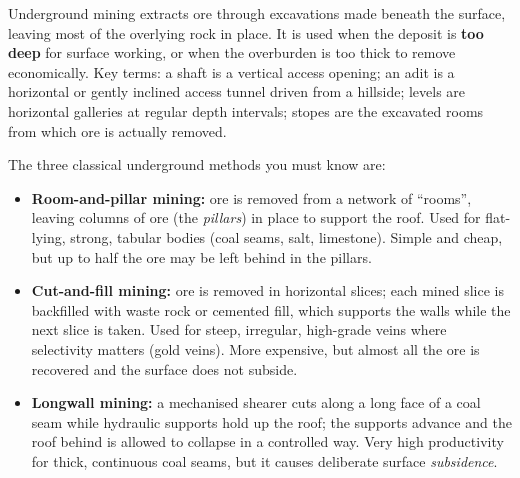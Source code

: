 \documentclass[11pt]{article}
\newcommand{\cle}[1]{{\popxbold\color{popdark}#1}}
\begin{document}
\begin{definition}
\cle{Underground mining} extracts ore through excavations made beneath the surface, leaving most of the overlying rock in place. It is used when the deposit is \textbf{too deep} for surface working, or when the overburden is too thick to remove economically. Key terms: a \cle{shaft} is a vertical access opening; an \cle{adit} is a horizontal or gently inclined access tunnel driven from a hillside; \cle{levels} are horizontal galleries at regular depth intervals; \cle{stopes} are the excavated rooms from which ore is actually removed.
\end{definition}

The three classical underground methods you must know are:

\begin{itemize}
\item \textbf{Room-and-pillar mining:} ore is removed from a network of ``rooms'', leaving columns of ore (the \emph{pillars}) in place to support the roof. Used for flat-lying, strong, tabular bodies (coal seams, salt, limestone). Simple and cheap, but up to half the ore may be left behind in the pillars.
\item \textbf{Cut-and-fill mining:} ore is removed in horizontal slices; each mined slice is backfilled with waste rock or cemented fill, which supports the walls while the next slice is taken. Used for steep, irregular, high-grade veins where selectivity matters (gold veins). More expensive, but almost all the ore is recovered and the surface does not subside.
\item \textbf{Longwall mining:} a mechanised shearer cuts along a long face of a coal seam while hydraulic supports hold up the roof; the supports advance and the roof behind is allowed to collapse in a controlled way. Very high productivity for thick, continuous coal seams, but it causes deliberate surface \emph{subsidence}.
\end{itemize}
\end{document}
